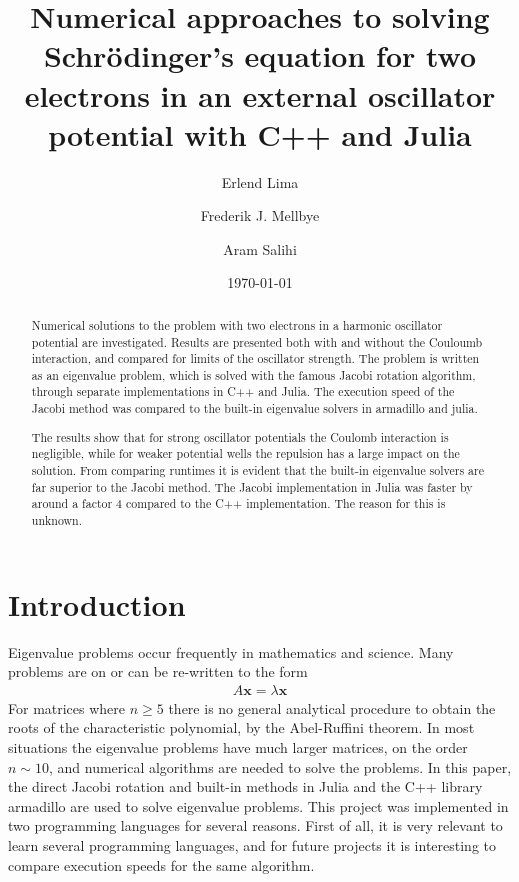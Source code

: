 \documentclass[aps,reprint]{revtex4-1}
\begin{document}
\title{Numerical approaches to solving Schrödinger's equation for
two electrons in an external oscillator potential with C++ and Julia}
\author{Erlend Lima}
\author{Frederik J. Mellbye}
\author{Aram Salihi}
\date{\today}

\begin{abstract}
Numerical solutions to the problem with two electrons in a harmonic oscillator
potential are investigated. Results are presented both with and without
the Couloumb interaction, and compared for limits of the oscillator strength.
The problem is written as an eigenvalue problem, which is solved with the
famous Jacobi rotation algorithm, through separate implementations in C++ and Julia.
The execution speed of the Jacobi method was compared to the built-in eigenvalue solvers
in armadillo and julia.

The results show that for strong oscillator potentials the Coulomb interaction is negligible,
while for weaker potential wells the repulsion has a large impact on the solution. From
comparing runtimes it is evident that the built-in eigenvalue solvers are far superior
to the Jacobi method. The Jacobi implementation in Julia was faster by around a factor
4 compared to the C++ implementation. The reason for this is unknown.
\end{abstract}
\maketitle
\tableofcontents
\makeatletter
\let\toc@pre\relax
\let\toc@post\relax
\makeatother

\newpage

\section{Introduction}
\label{sec:introduction}
Eigenvalue problems occur frequently in mathematics and science. Many problems
are on or can be re-written to the form
\begin{align*}
  A \mathbf{x} = \lambda \mathbf{x}
\end{align*}
For matrices where $n \geq 5$ there is
no general analytical procedure to obtain the roots of the characteristic polynomial, by the
Abel-Ruffini theorem. In most situations the eigenvalue problems have much
larger matrices, on the order \(n\sim 10\), and numerical algorithms are needed to solve the problems. In
this paper, the direct Jacobi rotation and built-in methods in Julia and the C++
library armadillo are used to solve eigenvalue problems. This project was implemented
in two programming languages for several reasons. First of all, it is very relevant to
learn several programming languages, and for future projects it is interesting
to compare execution speeds for the same algorithm.
\end{document}
